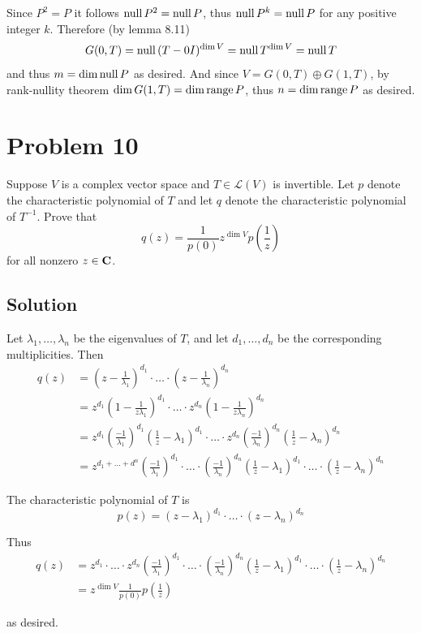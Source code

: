 \documentclass{article}
\begin{document}
\vs

Since $P^2=P$ it follows $\text{null}\, P^2=\text{null}\, P$, thus $\text{null}\, P^k=\text{null}\, P$ for any positive integer $k$. Therefore (by lemma 8.11)
\[G(0, T)=\text{null}\,(T-0I)^{\dim V}=\text{null}\, T^{\dim V}=\text{null}\, T\]
and thus $m=\dim\text{null}\, P$ as desired. And since $V=G(0, T)\oplus G(1, T)$, by rank-nullity theorem $\dim G(1,T)=\dim \text{range}\, P$, thus $n=\dim\text{range}\, P$ as desired.

\section*{Problem 10}
Suppose $V$ is a complex vector space and $T\in\mathcal{L}(V)$ is invertible. Let $p$ denote the characteristic polynomial of $T$ and let $q$ denote the characteristic polynomial of $T^{-1}$. Prove that
\[q(z)=\frac{1}{p(0)}z^{\dim V}p(\frac{1}{z})\]
for all nonzero $z\in\mathbf{C}$.

\subsection*{Solution}
Let $\lambda_1,\ldots,\lambda_n$ be the eigenvalues of $T$, and let $d_1,\ldots,d_n$ be the corresponding multiplicities. Then
\begin{align*}
    q(z)&=(z-\frac{1}{\lambda_1})^{d_1}\cdot\ldots\cdot(z-\frac{1}{\lambda_n})^{d_n}\\
    &=z^{d_1}(1-\frac{1}{z\lambda_1})^{d_1}\cdot\ldots\cdot z^{d_n}(1-\frac{1}{z\lambda_n})^{d_n}\\
    &=z^{d_1}(\frac{-1}{\lambda_1})^{d_1}(\frac{1}{z}-\lambda_1)^{d_1}\cdot\ldots\cdot z^{d_n}(\frac{-1}{\lambda_n})^{d_n}(\frac{1}{z}-\lambda_n)^{d_n}\\
    &=z^{d_1+\ldots+d^n}(\frac{-1}{\lambda_1})^{d_1}\cdot\ldots\cdot(\frac{-1}{\lambda_n})^{d_n}(\frac{1}{z}-\lambda_1)^{d_1}\cdot\ldots\cdot (\frac{1}{z}-\lambda_n)^{d_n}
\end{align*}

The characteristic polynomial of $T$ is
\[p(z)=(z-\lambda_1)^{d_1}\cdot\ldots\cdot(z-\lambda_n)^{d_n}\]

Thus
\begin{align*}
    q(z)&=z^{d_1}\cdot\ldots\cdot z^{d_n}(\frac{-1}{\lambda_1})^{d_1}\cdot\ldots\cdot(\frac{-1}{\lambda_n})^{d_n}(\frac{1}{z}-\lambda_1)^{d_1}\cdot\ldots\cdot (\frac{1}{z}-\lambda_n)^{d_n}\\
    &=z^{\dim V}\frac{1}{p(0)}p(\frac{1}{z})
\end{align*}

as desired.
\end{document}
